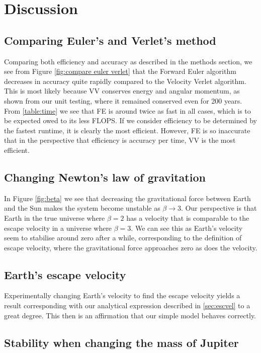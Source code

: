 \section{Discussion}
\label{sec:discussion}

\subsection{Comparing Euler's and Verlet's method}
Comparing both efficiency and accuracy as described in the methods section, we see from Figure \ref{fig:compare euler verlet}
that the Forward Euler algorithm decreases in accuracy quite rapidly compared to the Velocity Verlet algorithm. This is most likely because VV conserves energy and angular momentum, as shown from our unit testing, where it remained conserved even for 200 years. From \ref{table:time} we see that FE is around twice as fast in all cases, which is to be expected owed to its less FLOPS. If we consider efficiency to be determined by the fastest runtime, it is clearly the most efficient. However, FE is so inaccurate that in the perspective that efficiency is accuracy per time, VV is the most efficient.

\subsection{Changing Newton's law of gravitation}
In Figure \ref{fig:beta} we see that decreasing the gravitational force between Earth and the Sun makes the system become unstable as $\beta \rightarrow 3$. Our perspective is that Earth in the true universe where $\beta = 2$ has a velocity that is comparable to the escape velocity in a universe where $\beta = 3$. We can see this as Earth's velocity seem to stabilise around zero after a while, corresponding to the definition of escape velocity, where the gravitational force approaches zero as does the velocity.


\subsection{Earth's escape velocity}
Experimentally changing Earth's velocity to find the escape velocity yields a result corresponding with our analytical expression described in \ref{sec:escvel} to a great degree. This then is an affirmation that our simple model behaves correctly.


\subsection{Stability when changing the mass of Jupiter}

